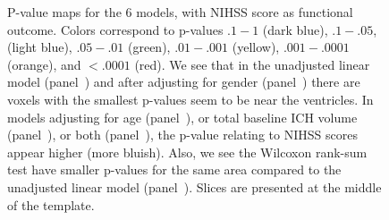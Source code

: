 \documentclass[10pt]{article}\usepackage[]{graphicx}\usepackage[]{color}
\begin{document}
\begin{figure}[H]
{ }
  \hfill
  \hfill
  
  \caption{P-value maps for the $6$ models, with NIHSS score as functional outcome. Colors correspond to p-values $.1-1$ (dark blue), $.1-.05$, (light blue), $.05-.01$ (green), $.01-.001$ (yellow),  $.001-.0001$ (orange), and $< .0001$ (red).  We see that in the unadjusted linear model (panel~\protect{}) and after adjusting for gender (panel~\protect{}) there are voxels with the smallest p-values seem to be near the ventricles.  In models adjusting for age (panel~\protect{}), or total baseline ICH volume (panel~\protect{}), or both (panel~\protect{}), the p-value relating to NIHSS scores appear higher (more bluish).  Also, we see the Wilcoxon rank-sum test have smaller p-values for the same area compared to the unadjusted linear model (panel~\protect{}). Slices are presented at the middle of the template.  }
  \label{f:mods}
\end{figure}
\end{document}
